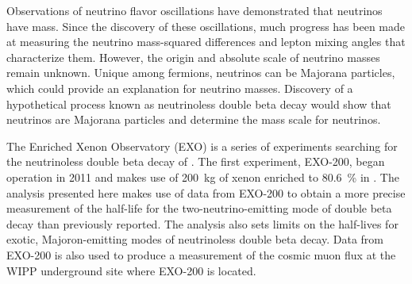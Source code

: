 Observations of neutrino flavor oscillations have demonstrated that neutrinos have mass. Since the discovery of these oscillations, much progress has been made at measuring the neutrino mass-squared differences and lepton mixing angles that characterize them. However, the origin and absolute scale of neutrino masses remain unknown. Unique among fermions, neutrinos can be Majorana particles, which could provide an explanation for neutrino masses. Discovery of a hypothetical process known as neutrinoless double beta decay would show that neutrinos are Majorana particles and determine the mass scale for neutrinos.

The Enriched Xenon Observatory (EXO) is a series of experiments searching for the neutrinoless double beta decay of . The first experiment, EXO-200, began operation in 2011 and makes use of \SI{200}{\kg} of xenon enriched to \SI{80.6}{\percent} in . The analysis presented here makes use of data from EXO-200 to obtain a more precise measurement of the half-life for the two-neutrino-emitting mode of double beta decay than previously reported. The analysis also sets limits on the half-lives for exotic, Majoron-emitting modes of neutrinoless double beta decay. Data from EXO-200 is also used to produce a measurement of the cosmic muon flux at the WIPP underground site where EXO-200 is located.
